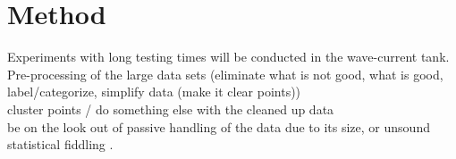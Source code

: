 %


\section{Method}
\label{sec:s2_method}
Experiments with long testing times will be conducted in the wave-current tank. \\
Pre-processing of the large data sets (eliminate what is not good, what is good, label/categorize, simplify data (make it clear points)) \\ 
cluster points / do something else with the cleaned up data \\
be on the look out of passive handling of the data due to its size, or unsound statistical fiddling \cite{Fricke2015}. 
